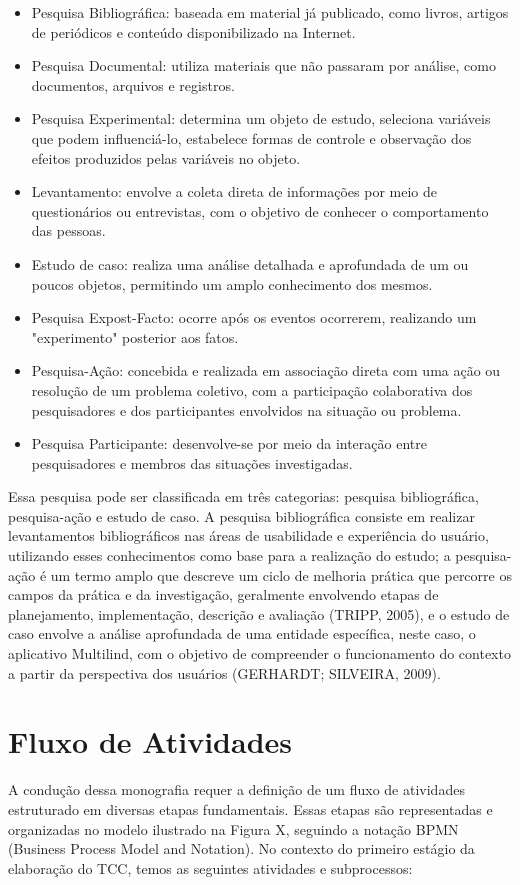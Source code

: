 \begin{itemize}
	\item Pesquisa Bibliográfica: baseada em material já publicado, como livros, artigos de periódicos e conteúdo disponibilizado na Internet.
	\item Pesquisa Documental: utiliza materiais que não passaram por análise, como documentos, arquivos e registros.
	\item Pesquisa Experimental: determina um objeto de estudo, seleciona variáveis que podem influenciá-lo, estabelece formas de controle e observação dos efeitos produzidos pelas variáveis no objeto.
	\item Levantamento: envolve a coleta direta de informações por meio de questionários ou entrevistas, com o objetivo de conhecer o comportamento das pessoas.
	\item Estudo de caso: realiza uma análise detalhada e aprofundada de um ou poucos objetos, permitindo um amplo conhecimento dos mesmos.
	\item Pesquisa Expost-Facto: ocorre após os eventos ocorrerem, realizando um "experimento" posterior aos fatos.
	\item Pesquisa-Ação: concebida e realizada em associação direta com uma ação ou resolução de um problema coletivo, com a participação colaborativa dos pesquisadores e dos participantes envolvidos na situação ou problema.
	\item Pesquisa Participante: desenvolve-se por meio da interação entre pesquisadores e membros das situações investigadas.
\end{itemize}

Essa pesquisa pode ser classificada em três categorias: pesquisa bibliográfica, pesquisa-ação e estudo de caso. A pesquisa bibliográfica consiste em realizar levantamentos bibliográficos nas áreas de usabilidade e experiência do usuário, 
utilizando esses conhecimentos como base para a realização do estudo; a pesquisa-ação é um termo amplo que descreve um ciclo de melhoria prática que percorre os campos da prática e da investigação, geralmente envolvendo etapas de planejamento, 
implementação, descrição e avaliação (TRIPP, 2005), e o estudo de caso envolve a análise aprofundada de uma entidade específica, neste caso, o aplicativo Multilind, com o objetivo de compreender o funcionamento do contexto a partir da perspectiva 
dos usuários (GERHARDT; SILVEIRA, 2009).

\section{Fluxo de Atividades}
\label{sec:Fluxo de Atividades}
A condução dessa monografia requer a definição de um fluxo de atividades estruturado em diversas etapas fundamentais. Essas etapas são representadas e organizadas no modelo ilustrado na Figura X, seguindo a notação BPMN (Business Process Model and Notation). 
No contexto do primeiro estágio da elaboração do TCC, temos as seguintes atividades e subprocessos:

